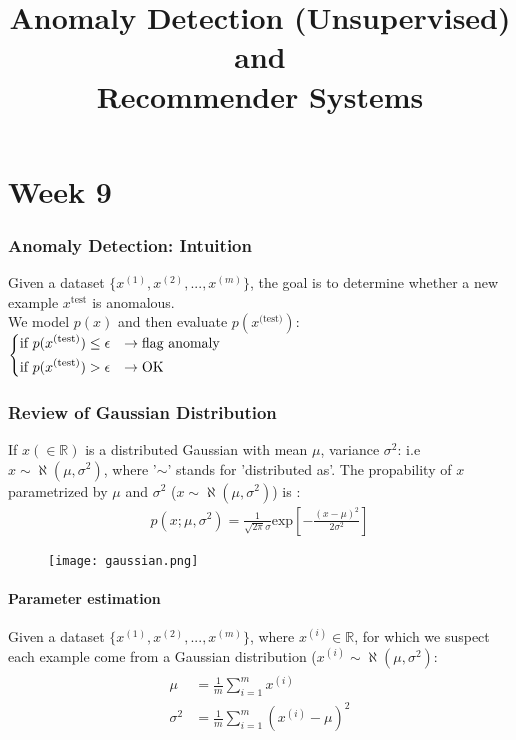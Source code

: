 \documentclass[a4paper,12pt]{report}
\begin{document}
\tableofcontents

\title{Anomaly Detection (Unsupervised) \\ and  \\ Recommender Systems}
\maketitle
\part{Week 9}
\section{Anomaly Detection: Intuition}
Given a dataset $\{ x^{(1)}, x^{(2)}, ..., x^{(m)}  \}$, the goal is to determine whether a new example $x^{\text{test}}$ is anomalous. \\
We model $p(x)$ and then evaluate $p(x^{\text{(test)}})$: $\begin{dcases}  \text{if\ } p(x^{\text{(test)}}) \leq \epsilon & \rightarrow \text{flag anomaly} \\
\text{if\ } p(x^{\text{(test)}}) > \epsilon & \rightarrow \text{OK} \end{dcases}$
\section{Review of Gaussian Distribution}
If $x (\in \mathbb{R})$ is a distributed Gaussian with mean $\mu$, variance $\sigma^2$: i.e $x \sim \aleph(\mu, \sigma^2)$, where '$\sim$' stands for 'distributed as'. The propability of $x$ parametrized by $\mu$ and $\sigma^2$ ($x \sim \aleph(\mu, \sigma^2)$) is :
\begin{align}
p(x; \mu, \sigma^2) = \frac{1}{\sqrt{2 \pi} \sigma} \text{exp}\left[-\frac{(x-\mu)^2}{2 \sigma^2} \right]
\end{align}
\begin{figure}[H]
\centering
        \texttt{[image: gaussian.png]}
\end{figure}

\subsection{Parameter estimation}
Given a dataset $\{x^{(1)}, x^{(2)}, ..., x^{(m)}  \}$, where $x^{(i)} \in \mathbb{R}$, for which we suspect each example come from a Gaussian distribution ($x^{(i)} \sim \aleph(\mu, \sigma^2)$:
\begin{align}
\begin{split}
\mu &= \frac{1}{m} \sum_{i=1} ^m x^{(i)} \\
\sigma^2 &= \frac{1}{m} \sum_{i=1} ^m (x^{(i)}-\mu)^2
\end{split}
\end{align}
\end{document}
